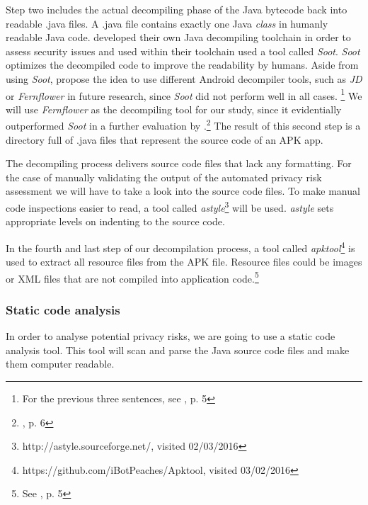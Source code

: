 \documentclass[
	a4paper,
	oneside,
	12pt,
	liststotocnumbered
]{article}
\let\cite\textcite
\begin{document}
Step two includes the actual decompiling phase of the Java bytecode back into readable .java files. 
A .java file contains exactly one Java \textit{class} in humanly readable Java code. 
\cite{Enck2011} developed their own Java decompiling toolchain in order to assess security issues and used within their toolchain used a tool called \textit{Soot}.
\textit{Soot} optimizes the decompiled code to improve the readability by humans.
Aside from using \textit{Soot}, \cite{Enck2011} propose the idea to use different Android decompiler tools, such as \textit{JD} or \textit{Fernflower} in future research, since \textit{Soot} did not perform well in all cases.  \footnote{For the previous three sentences, see \cite{Enck2011}, p. 5}
We will use \textit{Fernflower} as the decompiling tool for our study, since it evidentially outperformed \textit{Soot} in a further evaluation by \cite{Enck2011}.\footnote{\cite{Enck2011}, p. 6}
The result of this second step is a directory full of .java files that represent the source code of an \acs{APK} app.

The decompiling process delivers source code files that lack any formatting.
For the case of manually validating the output of the automated privacy risk assessment we will have to take a look into the source code files. 
To make manual code inspections easier to read, a tool called \textit{astyle}\footnote{http://astyle.sourceforge.net/, visited 02/03/2016} will be used. 
\textit{astyle} sets appropriate levels on indenting to the source code.

In the fourth and last step of our decompilation process, a tool called \textit{apktool}\footnote{https://github.com/iBotPeaches/Apktool, visited 03/02/2016} is used to extract all resource files from the \acs{APK} file. Resource files could be images or XML files that are not compiled into application code.\footnote{See \cite{xu2013techniques}, p. 5}

\subsubsection{Static code analysis}
In order to analyse potential privacy risks, we are going to use a static code analysis tool.
This tool will scan and parse the Java source code files and make them computer readable.
\end{document}
